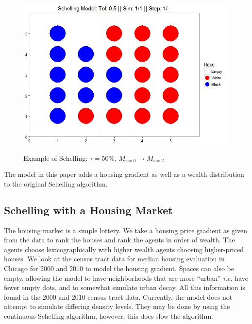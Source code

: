 \documentclass[11pt]{asaproc}
\newcommand{\1}{\mathbb{1}}
\begin{document}
\begin{figure}[h!]
{}
{%
\includegraphics[scale=0.23]{figures/Ex2.jpeg}
}

\caption[Example of Schelling Process]{Example of Schelling: $\tau = 50\%,\ M_{i=0} \rightarrow M_{i=2}$}
\end{figure}

The model in this paper adds a housing gradient as well as a wealth distribution to the original Schelling algorithm.

\subsection{Schelling with a Housing Market}

The housing market is a simple lottery. We take a housing price gradient as given from the data to rank the houses and rank the agents in order of wealth. The agents choose lexicographically with higher wealth agents choosing higher-priced houses. We look at the census tract data for median housing evaluation in Chicago for 2000 and 2010 to model the housing gradient. Spaces can also be empty, allowing the model to have neighborhoods that are more ``urban'' \textit{i.e.} have fewer empty dots, and to somewhat simulate urban decay. All this information is found in the 2000 and 2010 census tract data. Currently, the model does not attempt to simulate differing density levels. They may be done by using the continuous Schelling algorithm, however, this does slow the algorithm.
\end{document}
